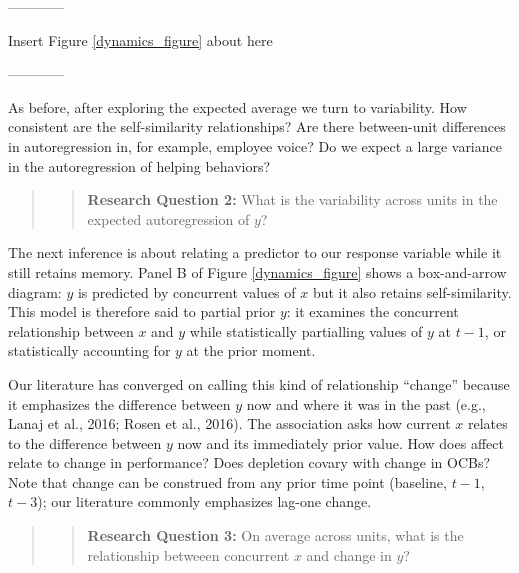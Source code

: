 \documentclass[english,,man]{apa6}
\theoremstyle{definition}
\theoremstyle{definition}
\theoremstyle{definition}
\theoremstyle{remark}
\begin{document}
\begin{center}

------------

Insert Figure \ref{dynamics_figure} about here

------------

\end{center}

As before, after exploring the expected average we turn to variability.
How consistent are the self-similarity relationships? Are there
between-unit differences in autoregression in, for example, employee
voice? Do we expect a large variance in the autoregression of helping
behaviors?

\begin{quote}
\begin{quote}
\textbf{Research Question 2:} What is the variability across units in
the expected autoregression of \(y\)?
\end{quote}
\end{quote}

The next inference is about relating a predictor to our response
variable while it still retains memory. Panel B of Figure
\ref{dynamics_figure} shows a box-and-arrow diagram: \(y\) is predicted
by concurrent values of \(x\) but it also retains self-similarity. This
model is therefore said to partial prior \(y\): it examines the
concurrent relationship between \(x\) and \(y\) while statistically
partialling values of \(y\) at \(t - 1\), or statistically accounting
for \(y\) at the prior moment.

Our literature has converged on calling this kind of relationship
\enquote{change} because it emphasizes the difference between \(y\) now
and where it was in the past (e.g., Lanaj et al., 2016; Rosen et al.,
2016). The association asks how current \(x\) relates to the difference
between \(y\) now and its immediately prior value. How does affect
relate to change in performance? Does depletion covary with change in
OCBs? Note that change can be construed from any prior time point
(baseline, \(t-1\), \(t-3\)); our literature commonly emphasizes lag-one
change.

\begin{quote}
\begin{quote}
\textbf{Research Question 3:} On average across units, what is the
relationship betweeen concurrent \(x\) and change in \(y\)?
\end{quote}
\end{quote}
\end{document}
